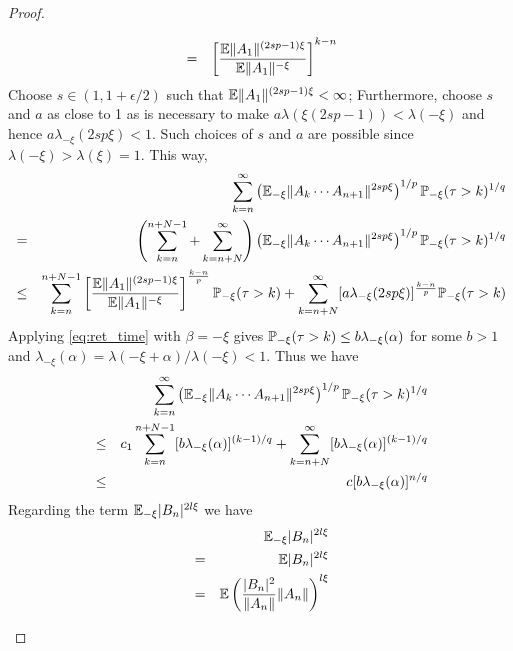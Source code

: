 \documentclass{article}
\theoremstyle{remark}
\begin{document}
\begin{proof}
\begin{enumerate}
\begin{enumerate}
\begin{eqnarray*}
        &=& \left[{\E \|A_1\|^{(2sp - 1)\xi}
            \over
            \E \|A_1\|^{-\xi}}
        \right]^{k-n}
      \end{eqnarray*}
      Choose $s \in (1, {1 + \epsilon/2})$ such that $\E
      \|A_1\|^{(2sp - 1)\xi} < \infty$; Furthermore, choose $s$ and $a$
      as close to 1 as is necessary to make $a \lambda(\xi(2sp - 1)) <
      \lambda(-\xi)$ and hence $a \lambda_{-\xi}(2sp\xi) < 1$. Such
      choices of $s$ and $a$ are possible since $\lambda(-\xi) >
      \lambda(\xi)=1$. This way,
      \begin{eqnarray*}
        && \sum_{k=n}^\infty
        \left(\E_{-\xi}
          \|A_k \cdots A_{n+1}\|^{2sp\xi}
        \right)^{1/p}
        \P_{-\xi}(\tau > k)^{1/q} \\
        &=& \left(
          \sum_{k=n}^{n+N-1} + \sum_{k=n+N}^{\infty}
        \right) \left(\E_{-\xi}
          \|A_k \cdots A_{n+1}\|^{2sp\xi}
        \right)^{1/p}
        \P_{-\xi}(\tau > k)^{1/q} \\
        &\leq& \sum_{k=n}^{n+N-1} \left[ {
            \E \|A_1\|^{(2sp-1)\xi}
            \over
            \E \|A_1\|^{-\xi}
        }\right]^{k-n \over p} \P_{-\xi}(\tau > k)
      + \sum_{k=n+N}^\infty 
      [a \lambda_{-\xi}(2sp\xi)]^{k-n \over p}
      \P_{-\xi}(\tau > k)
      \end{eqnarray*}
      Applying \eqref{eq:ret_time} with $\beta = -\xi$ gives
      $\P_{-\xi}(\tau > k) \leq b \lambda_{-\xi}(\alpha)$ for some $b
      > 1$ and $\lambda_{-\xi}(\alpha) = \lambda(-\xi +
      \alpha)/\lambda(-\xi) < 1$. Thus we have
      \begin{eqnarray*}
        && \sum_{k=n}^\infty
        \left(\E_{-\xi}
          \|A_k \cdots A_{n+1}\|^{2sp\xi}
        \right)^{1/p}
        \P_{-\xi}(\tau > k)^{1/q} \\
        &\leq& c_1 \sum_{k=n}^{n+N-1}
        [b \lambda_{-\xi}(\alpha)]^{(k-1)/q}
        + \sum_{k=n+N}^\infty
        [b \lambda_{-\xi}(\alpha)]^{(k-1)/q} \\
        &\leq& c [b \lambda_{-\xi}(\alpha)]^{n/q}
      \end{eqnarray*}
      Regarding the term $\E_{-\xi}|B_n|^{2l\xi}$ we have
      \begin{eqnarray*}
        && \E_{-\xi}|B_n|^{2l\xi} \\
        &=& \E|B_n|^{2l\xi} \\
        &=& \E \left(
          {|B_n|^2 \over \|A_n\|}
          \|A_n\|
        \right)^{l\xi} \\

\end{eqnarray*}
\end{enumerate}
\end{enumerate}
\end{proof}
\end{document}
